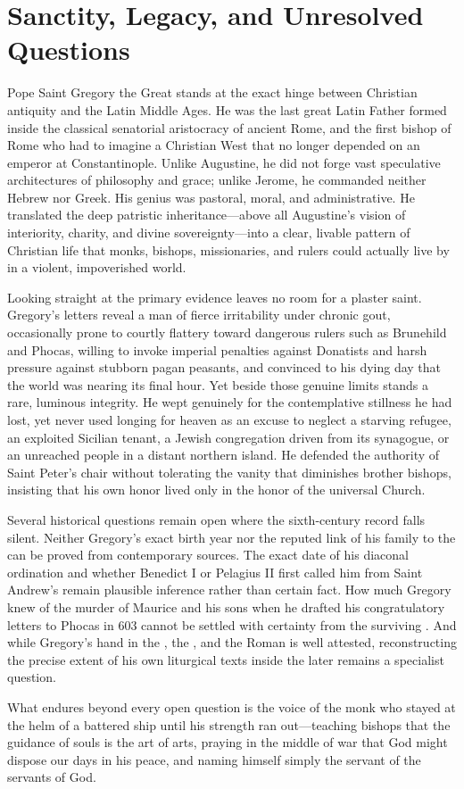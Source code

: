 \section{Sanctity, Legacy, and Unresolved Questions}

Pope Saint Gregory the Great stands at the exact hinge between Christian
antiquity and the Latin Middle Ages. He was the last great Latin Father formed
inside the classical senatorial aristocracy of ancient Rome, and the first
bishop of Rome who had to imagine a Christian West that no longer depended on
an emperor at Constantinople. Unlike Augustine, he did not forge vast
speculative architectures of philosophy and grace; unlike Jerome, he commanded
neither Hebrew nor Greek. His genius was pastoral, moral, and administrative.
He translated the deep patristic inheritance---above all Augustine's vision of
interiority, charity, and divine sovereignty---into a clear, livable pattern
of Christian life that monks, bishops, missionaries, and rulers could actually
live by in a violent, impoverished world.

Looking straight at the primary evidence leaves no room for a plaster saint.
Gregory's letters reveal a man of fierce irritability under chronic gout,
occasionally prone to courtly flattery toward dangerous rulers such as
Brunehild and Phocas, willing to invoke imperial penalties against Donatists
and harsh pressure against stubborn pagan peasants, and convinced to his dying
day that the world was nearing its final hour. Yet beside those genuine limits
stands a rare, luminous integrity. He wept genuinely for the contemplative
stillness he had lost, yet never used longing for heaven as an excuse to
neglect a starving refugee, an exploited Sicilian tenant, a Jewish congregation
driven from its synagogue, or an unreached people in a distant northern island.
He defended the authority of Saint Peter's chair without tolerating the vanity
that diminishes brother bishops, insisting that his own honor lived only in
the honor of the universal Church.

Several historical questions remain open where the sixth-century record falls
silent. Neither Gregory's exact birth year nor the reputed link of his family
to the  can be proved from contemporary sources. The exact
date of his diaconal ordination and whether Benedict I or Pelagius II first
called him from Saint Andrew's remain plausible inference rather than certain
fact. How much Gregory knew of the murder of Maurice and his sons when he
drafted his congratulatory letters to Phocas in 603 cannot be settled with
certainty from the surviving . And while Gregory's hand in the
, the , and the Roman  is
well attested, reconstructing the precise extent of his own liturgical texts
inside the later  remains a specialist question.

What endures beyond every open question is the voice of the monk who stayed at
the helm of a battered ship until his strength ran out---teaching bishops that
the guidance of souls is the art of arts, praying in the middle of war that
God might dispose our days in his peace, and naming himself simply the servant
of the servants of God.
